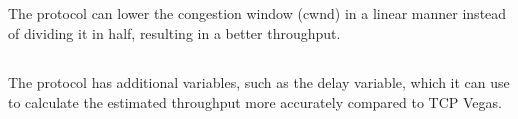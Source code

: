 \documentclass{article}
\begin{document}
\subsection{}
The protocol can lower the congestion window (cwnd) in a linear manner instead of dividing it in half,
resulting in a better throughput.

\subsection{}
The protocol has additional variables, such as the delay variable,
which it can use to calculate the estimated throughput more accurately compared to TCP Vegas.



\end{document}
